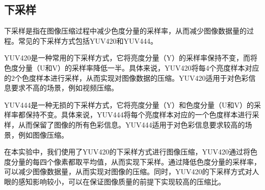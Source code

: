 \documentclass{article}
\begin{document}
\subsection{下采样}

下采样是指在图像压缩过程中减少色度分量的采样率，从而减少图像数据量的过程。常见的下采样方式包括YUV420和YUV444。

YUV420是一种常用的下采样方式，它将亮度分量（Y）的采样率保持不变，而将色度分量（U和V）的采样率降低一半。具体来说，YUV420将每4个亮度样本对应的2个色度样本进行采样，从而实现对图像数据的压缩。YUV420适用于对色彩信息要求不高的场景，例如视频压缩。

YUV444是一种无损的下采样方式，它将亮度分量（Y）和色度分量（U和V）的采样率都保持不变。具体来说，YUV444将每个亮度样本对应的一个色度样本进行采样，从而保留了图像的所有色彩信息。YUV444适用于对色彩信息要求较高的场景，例如图像压缩。

在本实验中，我们使用了YUV420的下采样方式进行图像压缩，YUV420通过将色度分量的每四个像素都取平均值，从而实现下采样。通过降低色度分量的采样率，可以减少图像数据量，从而实现对图像的压缩。同时，YUV420的下采样方式对人眼的感知影响较小，可以在保证图像质量的前提下实现较高的压缩比。
\end{document}
